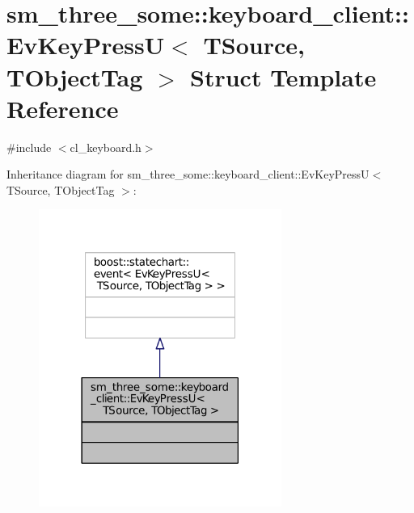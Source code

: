 \hypertarget{structsm__three__some_1_1keyboard__client_1_1EvKeyPressU}{}\section{sm\+\_\+three\+\_\+some\+:\+:keyboard\+\_\+client\+:\+:Ev\+Key\+PressU$<$ T\+Source, T\+Object\+Tag $>$ Struct Template Reference}
\label{structsm__three__some_1_1keyboard__client_1_1EvKeyPressU}


{\ttfamily \#include $<$cl\+\_\+keyboard.\+h$>$}



Inheritance diagram for sm\+\_\+three\+\_\+some\+:\+:keyboard\+\_\+client\+:\+:Ev\+Key\+PressU$<$ T\+Source, T\+Object\+Tag $>$\+:
\nopagebreak
\begin{figure}[H]
\begin{center}
\leavevmode
\includegraphics[width=225pt]{structsm__three__some_1_1keyboard__client_1_1EvKeyPressU__inherit__graph}
\end{center}
\end{figure}


